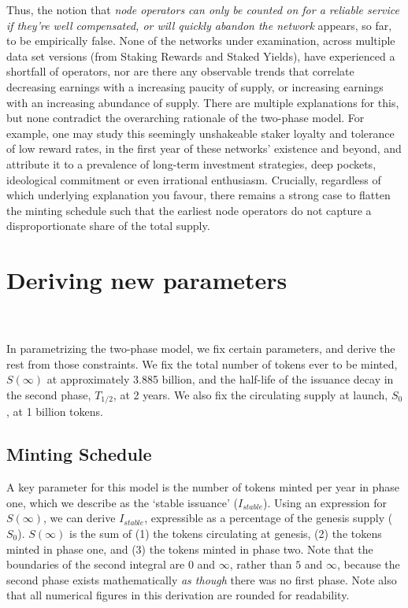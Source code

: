 \documentclass[8pt]{article}
\begin{document}
Thus, the notion that \textit{node operators can only be counted on for a reliable service if they're well compensated, or will quickly abandon the network} appears, so far, to be empirically false. None of the networks under examination, across multiple data set versions (from Staking Rewards and Staked Yields), have experienced a shortfall of operators, nor are there any observable trends that correlate decreasing earnings with a increasing paucity of supply, or increasing earnings with an increasing abundance of supply. There are multiple explanations for this, but none contradict the overarching rationale of the two-phase model. For example, one may study this seemingly unshakeable staker loyalty and tolerance of low reward rates, in the first year of these networks' existence and beyond, and attribute it to a prevalence of long-term investment strategies, deep pockets, ideological commitment or even irrational enthusiasm. Crucially, regardless of which underlying explanation you favour, there remains a strong case to flatten the minting schedule such that the earliest node operators do not capture a disproportionate share of the total supply.

\section{Deriving new parameters}

\\\\
In parametrizing the two-phase model, we fix certain parameters, and derive the rest from those constraints. We fix the total number of tokens ever to be minted, $S(\infty)$ at approximately 3.885 billion, and the half-life of the issuance decay in the second phase, $T_{1/2}$, at 2 years. We also fix the circulating supply at launch, $S_0$, at 1 billion tokens.

\subsection{Minting Schedule}
A key parameter for this model is the number of tokens minted per year in phase one, which we describe as the `stable issuance' ($I_{stable}$). Using an expression for $S(\infty)$, we can derive $I_{stable}$, expressible as a percentage of the genesis supply ($S_0$). $S(\infty)$ is the sum of (1) the tokens circulating at genesis, (2) the tokens minted in phase one, and (3) the tokens minted in phase two. Note that the boundaries of the second integral are $0$ and $\infty$, rather than $5$ and $\infty$, because the second phase exists mathematically \textit{as though} there was no first phase. Note also that all numerical figures in this derivation are rounded for readability.
\end{document}
